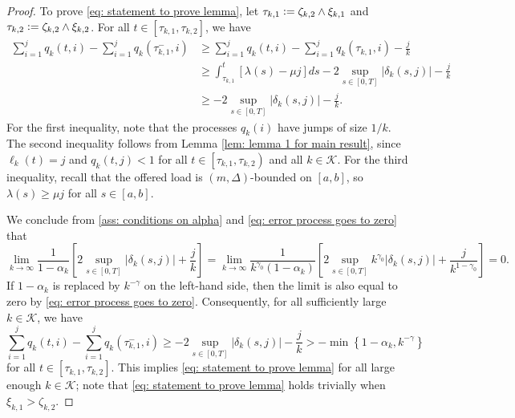 \documentclass[a4paper, 12pt]{article}
\theoremstyle{definition}
\newcommand{\defeq}{\vcentcolon=}
\newcommand{\calK}{\mathcal{K}}
\begin{document}
\begin{proof}
To prove \eqref{eq: statement to prove lemma}, let $\tau_{k, 1} \defeq \zeta_{k, 2} \wedge \xi_{k, 1}$ and $\tau_{k, 2} \defeq \zeta_{k, 2} \wedge \xi_{k, 2}$. For all $t \in \left[\tau_{k, 1}, \tau_{k, 2}\right]$, we have
\begin{align*}
	\sum_{i = 1}^j q_k(t, i) - \sum_{i = 1}^j q_k\left(\tau_{k, 1}^-, i\right) &\geq \sum_{i = 1}^j q_k(t, i) - \sum_{i = 1}^j q_k\left(\tau_{k, 1}, i\right) - \frac{j}{k} \\
	&\geq \int_{\tau_{k, 1}}^t \left[\lambda(s) - \mu j\right]ds - 2\sup_{s \in [0, T]} \left|\delta_k(s, j)\right| - \frac{j}{k} \\
	&\geq - 2\sup_{s \in [0, T]} \left|\delta_k(s, j)\right| - \frac{j}{k}.
\end{align*}
For the first inequality, note that the processes $q_k(i)$ have jumps of size $1 / k$. The second inequality follows from Lemma \ref{lem: lemma 1 for main result}, since $\ell_k(t) = j$ and $q_k(t, j) < 1$ for all $t \in \left[\tau_{k, 1}, \tau_{k, 2}\right)$ and all $k \in \calK$. For the third inequality, recall that the offered load is $(m, \Delta)$-bounded on $[a, b]$, so $\lambda(s) \geq \mu j$ for all $s \in [a, b]$.

We conclude from \eqref{ass: conditions on alpha} and \eqref{eq: error process goes to zero} that
\begin{equation*}
	\lim_{k \to \infty} \frac{1}{1 - \alpha_k}\left[2\sup_{s \in [0, T]} |\delta_k(s, j)| + \frac{j}{k}\right] = \lim_{k \to \infty} \frac{1}{k^{\gamma_0}(1 - \alpha_k)}\left[2\sup_{s \in [0, T]} k^{\gamma_0}|\delta_k(s, j)| + \frac{j}{k^{1 - {\gamma_0}}}\right] = 0.
\end{equation*}
If $1 - \alpha_k$ is replaced by $k^{-\gamma}$ on the left-hand side, then the limit is also equal to zero by \eqref{eq: error process goes to zero}. Consequently, for all sufficiently large $k \in \calK$, we have
\begin{equation*}
	\sum_{i = 1}^j q_k(t, i) - \sum_{i = 1}^j q_k\left(\tau_{k, 1}^-, i\right) \geq - 2\sup_{s \in [0, T]} \left|\delta_k(s, j)\right| - \frac{j}{k} > - \min\left\{1 - \alpha_k, k^{-\gamma}\right\}
\end{equation*}
for all $t \in \left[\tau_{k, 1}, \tau_{k, 2}\right]$. This implies \eqref{eq: statement to prove lemma} for all large enough $k \in \calK$; note that \eqref{eq: statement to prove lemma} holds trivially when $\xi_{k, 1} > \zeta_{k, 2}$.
%
\end{proof}
\end{document}
